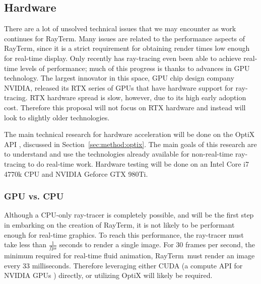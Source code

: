 \documentclass[11pt]{article}
\newcommand{\name}{{\sc RayTerm}}
\begin{document}
\subsection{Hardware}
\label{sec:method:hardware}

There are a lot of unsolved technical issues that we may encounter as work continues for \name.
Many issues are related to the performance aspects of \name, since it is a strict requirement for obtaining render times low enough for real-time display.
Only recently has ray-tracing even been able to achieve real-time levels of performance; much of this progress is thanks to advances in GPU technology.
The largest innovator in this space, GPU chip design company NVIDIA, released its RTX series of GPUs that have hardware support for ray-tracing.
RTX hardware spread is slow, however, due to its high early adoption cost.
Therefore this proposal will not focus on RTX hardware and instead will look to slightly older technologies.

The main technical research for hardware acceleration will be done on the OptiX API \cite{parker2010optix}, discussed in Section~\ref{sec:method:optix}.
The main goals of this research are to understand and use the technologies already available for non-real-time ray-tracing to do real-time work.
Hardware testing will be done on an Intel Core i7 4770k CPU and NVIDIA Geforce GTX 980Ti.

\subsubsection{GPU vs. CPU}
\label{sec:method:gpu_vs_cpu}

Although a CPU-only ray-tracer is completely possible, and will be the first step in embarking on the creation of \name, it is not likely to be performant enough for real-time graphics.
To reach this performance, the ray-tracer must take less than $\frac{1}{f\!\!ps}$ seconds to render a single image.
For $30$ frames per second, the minimum required for real-time fluid animation, \name\ must render an image every $33$ milliseconds.
Therefore leveraging either CUDA (a compute API for NVIDIA GPUs \cite{nvidia2011cuda}) directly, or utilizing OptiX will likely be required.
\end{document}
